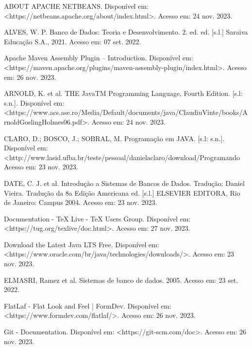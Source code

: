 \documentclass[a4paper,12pt]{article}
\begin{document}
\raggedright
\noindent ABOUT APACHE NETBEANS. Disponível em: <https://netbeans.apache.org/about/index.html>. Acesso em: 24 nov. 2023. \linebreak

\noindent ALVES, W. P. Banco de Dados: Teoria e Desenvolvimento. 2. ed. ed. [s.l.] Saraiva Educação S.A., 2021. Acesso em: 07 set. 2022. \linebreak 

\noindent Apache Maven Assembly Plugin – Introduction. Disponível em: <https://maven.apache.org/plugins/maven-assembly-plugin/index.html>. 
Acesso em: 26 nov. 2023. \linebreak

\noindent ARNOLD, K. et al. THE JavaTM Programming Language, Fourth Edition. [s.l: s.n.]. 
Disponível em: <https://www.acs.ase.ro/Media/Default/documents/java/ClaudiuVinte/books/ArnoldGoslingHolmes06.pdf>. 
Acesso em: 24 nov. 2023. \linebreak

\noindent CLARO, D.; BOSCO, J.; SOBRAL, M. Programação em JAVA. [s.l: s.n.]. 
Disponível em: <http://www.lasid.ufba.br/teste/pessoal/danielaclaro/download/Programando\\%
Acesso em: 23 nov. 2023. \linebreak

\noindent DATE, C. J. et al. Introdução a Sistemas de Bancos de Dados. Tradução: Daniel Vieira. Tradução da 8a Edição Americana ed. [s.l.] 
ELSEVIER EDITORA, Rio de Janeiro: Campus 2004. Acesso em: 23 nov. 2023. \linebreak

\noindent Documentation - TeX Live - TeX Users Group. Disponível em: <https://tug.org/texlive/doc.html>. Acesso em: 27 nov. 2023. \linebreak

\noindent Download the Latest Java LTS Free. Disponível em: <https://www.oracle.com/br/java/technologies/downloads/>. 
Acesso em: 23 nov. 2023. \linebreak

\noindent ELMASRI, Ramez et al. Sistemas de banco de dados. 2005. Acesso em: 23 set. 2022. \linebreak

\noindent FlatLaf - Flat Look and Feel | FormDev. Disponível em: <https://www.formdev.com/flatlaf/>. Acesso em: 26 nov. 2023. \linebreak

\noindent Git - Documentation. Disponível em: <https://git-scm.com/doc>. ‌Acesso em: 26 nov. 2023. \linebreak
\end{document}
